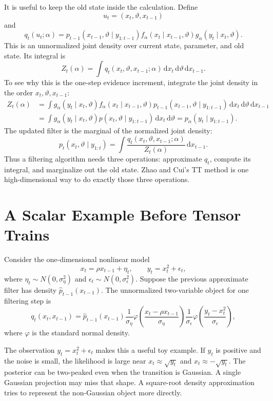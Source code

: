 \documentclass[11pt]{article}
\newcommand{\dd}{\mathrm{d}}
\theoremstyle{definition}
\theoremstyle{remark}
\begin{document}
It is useful to keep the old state inside the calculation.  Define
\[
  u_t=(x_t,\vartheta,x_{t-1})
\]
and
\[
  q_t(u_t;\alpha)
  =
  p_{t-1}(x_{t-1},\vartheta\mid y_{1:t-1})
  f_\alpha(x_t\mid x_{t-1},\vartheta)
  g_\alpha(y_t\mid x_t,\vartheta).
  \label{eq:p13-exact-q}
\]
This is an unnormalized joint density over current state, parameter, and old
state.  Its integral is
\[
  Z_t(\alpha)
  =
  \int q_t(x_t,\vartheta,x_{t-1};\alpha)\,
  \dd x_t\,\dd\vartheta\,\dd x_{t-1}.
  \label{eq:p13-exact-evidence-increment}
\]
To see why this is the one-step evidence increment, integrate the joint density
in the order \(x_t,\vartheta,x_{t-1}\):
\[
\begin{aligned}
  Z_t(\alpha)
  &=
  \int
  g_\alpha(y_t\mid x_t,\vartheta)
  f_\alpha(x_t\mid x_{t-1},\vartheta)
  p_{t-1}(x_{t-1},\vartheta\mid y_{1:t-1})
  \,\dd x_t\,\dd\vartheta\,\dd x_{t-1}  \\
  &=
  \int
  g_\alpha(y_t\mid x_t,\vartheta)
  p(x_t,\vartheta\mid y_{1:t-1})
  \,\dd x_t\,\dd\vartheta
  =
  p_\alpha(y_t\mid y_{1:t-1}).
\end{aligned}
\]
The updated filter is the marginal of the normalized joint density:
\[
  p_t(x_t,\vartheta\mid y_{1:t})
  =
  \int
  \frac{q_t(x_t,\vartheta,x_{t-1};\alpha)}{Z_t(\alpha)}
  \,\dd x_{t-1}.
  \label{eq:p13-exact-filter-marginal}
\]
Thus a filtering algorithm needs three operations: approximate \(q_t\), compute
its integral, and marginalize out the old state.  Zhao and Cui's TT method is
one high-dimensional way to do exactly those three operations.

\section{A Scalar Example Before Tensor Trains}

Consider the one-dimensional nonlinear model
\[
  x_t=\rho x_{t-1}+\eta_t,\qquad
  y_t=x_t^2+\epsilon_t,
\]
where \(\eta_t\sim N(0,\sigma_\eta^2)\) and
\(\epsilon_t\sim N(0,\sigma_\epsilon^2)\).  Suppose the previous approximate
filter has density \(\widehat p_{t-1}(x_{t-1})\).  The unnormalized two-variable
object for one filtering step is
\[
  q_t(x_t,x_{t-1})
  =
  \widehat p_{t-1}(x_{t-1})
  \frac{1}{\sigma_\eta}
  \varphi\!\left(\frac{x_t-\rho x_{t-1}}{\sigma_\eta}\right)
  \frac{1}{\sigma_\epsilon}
  \varphi\!\left(\frac{y_t-x_t^2}{\sigma_\epsilon}\right),
  \label{eq:p13-scalar-q}
\]
where \(\varphi\) is the standard normal density.

The observation \(y_t=x_t^2+\epsilon_t\) makes this a useful toy example.  If
\(y_t\) is positive and the noise is small, the likelihood is large near
\(x_t\approx \sqrt{y_t}\) and \(x_t\approx-\sqrt{y_t}\).  The posterior can be
two-peaked even when the transition is Gaussian.  A single Gaussian projection
may miss that shape.  A square-root density approximation tries to represent
the non-Gaussian object more directly.
\end{document}
